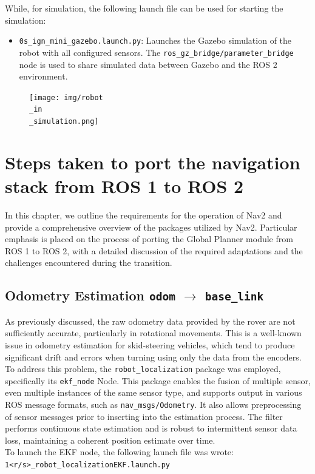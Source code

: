 \newpage
While, for simulation, the following launch file can be used for starting the simulation:
\begin{itemize}
	\item \texttt{0s\_ign\_mini\_gazebo.launch.py}: Launches the Gazebo simulation of the robot with all configured sensors. The \texttt{ros\_gz\_bridge/parameter\_bridge} node is used to share simulated data between Gazebo and the ROS 2 environment.
\end{itemize}
\begin{figure}[h]
	\centering
	\texttt{[image: img/robot\\\_in\\\_simulation.png]}
\end{figure}


\chapter{Steps taken to port the navigation stack from ROS 1 to ROS 2}
In this chapter, we outline the requirements for the operation of Nav2 and provide a comprehensive overview of the packages utilized by Nav2. Particular emphasis is placed on the process of porting the Global Planner module from ROS 1 to ROS 2, with a detailed discussion of the required adaptations and the challenges encountered during the transition.

\section{Odometry Estimation \texttt{odom} $\rightarrow$ \texttt{base\_link}}
As previously discussed, the raw odometry data provided by the rover are not sufficiently accurate, particularly in rotational movements\cite{MooreStouchKeneralizedEkf2014}. This is a well-known issue in odometry estimation for skid-steering vehicles, which tend to produce significant drift and errors when turning using only the data from the encoders.\\
To address this problem, the \texttt{robot\_localization} package\cite{MooreStouchKeneralizedEkf2014} was employed, specifically its \texttt{ekf\_node} Node.
This package enables the fusion of multiple sensor, even multiple instances of the same sensor type, and supports output in various ROS message formats, such as \texttt{nav\_msgs/Odometry}. It also allows preprocessing of sensor messages prior to inserting into the estimation process. The filter performs continuous state estimation and is robust to intermittent sensor data loss, maintaining a coherent position estimate over time.\\
To launch the EKF node, the following launch file was wrote:\\
\hspace*{10mm}\texttt{1<r/s>\_robot\_localizationEKF.launch.py}

